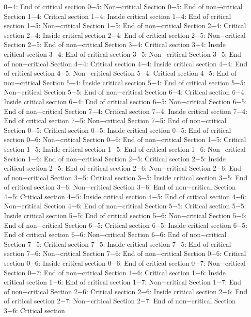 0−4: End of critical section
0−5: Non−critical Section
0−5: End of non−critical Section
1−4: Critical section
1−4: Inside critical section
1−4: End of critical section
1−5: Non−critical Section
1−5: End of non−critical Section
2−4: Critical section
2−4: Inside critical section
2−4: End of critical section
2−5: Non−critical Section
2−5: End of non−critical Section
3−4: Critical section
3−4: Inside critical section
3−4: End of critical section
3−5: Non−critical Section
3−5: End of non−critical Section
4−4: Critical section
4−4: Inside critical section
4−4: End of critical section
4−5: Non−critical Section
5−4: Critical section
4−5: End of non−critical Section
5−4: Inside critical section
5−4: End of critical section
5−5: Non−critical Section
5−5: End of non−critical Section
6−4: Critical section
6−4: Inside critical section
6−4: End of critical section
6−5: Non−critical Section
6−5: End of non−critical Section
7−4: Critical section
7−4: Inside critical section
7−4: End of critical section
7−5: Non−critical Section
7−5: End of non−critical Section
0−5: Critical section
0−5: Inside critical section
0−5: End of critical section
0−6: Non−critical Section
0−6: End of non−critical Section
1−5: Critical section
1−5: Inside critical section
1−5: End of critical section
1−6: Non−critical Section
1−6: End of non−critical Section
2−5: Critical section
2−5: Inside critical section
2−5: End of critical section
2−6: Non−critical Section
2−6: End of non−critical Section
3−5: Critical section
3−5: Inside critical section
3−5: End of critical section
3−6: Non−critical Section
3−6: End of non−critical Section
4−5: Critical section
4−5: Inside critical section
4−5: End of critical section
4−6: Non−critical Section
4−6: End of non−critical Section
5−5: Critical section
5−5: Inside critical section
5−5: End of critical section
5−6: Non−critical Section
5−6: End of non−critical Section
6−5: Critical section
6−5: Inside critical section
6−5: End of critical section
6−6: Non−critical Section
6−6: End of non−critical Section
7−5: Critical section
7−5: Inside critical section
7−5: End of critical section
7−6: Non−critical Section
7−6: End of non−critical Section
0−6: Critical section
0−6: Inside critical section
0−6: End of critical section
0−7: Non−critical Section
0−7: End of non−critical Section
1−6: Critical section
1−6: Inside critical section
1−6: End of critical section
1−7: Non−critical Section
1−7: End of non−critical Section
2−6: Critical section
2−6: Inside critical section
2−6: End of critical section
2−7: Non−critical Section
2−7: End of non−critical Section
3−6: Critical section
